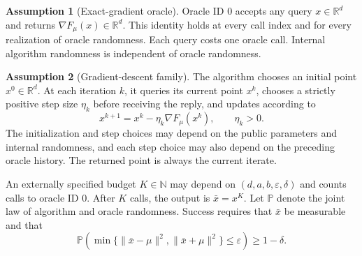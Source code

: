 \documentclass[10pt]{article}
\theoremstyle{definition}
\newtheorem{assumption}{Assumption}
\begin{document}
\begin{assumption}[Exact-gradient oracle]
Oracle ID $0$ accepts any query $x\in\mathbb{R}^d$ and returns $\nabla F_\mu(x)\in\mathbb{R}^d$. This identity holds at every call index and for every realization of oracle randomness. Each query costs one oracle call. Internal algorithm randomness is independent of oracle randomness.
\end{assumption}

\begin{assumption}[Gradient-descent family]
The algorithm chooses an initial point $x^0\in\mathbb{R}^d$. At each iteration $k$, it queries its current point $x^k$, chooses a strictly positive step size $\eta_k$ before receiving the reply, and updates according to
\[
x^{k+1}=x^k-\eta_k\nabla F_\mu(x^k),
\qquad \eta_k>0.
\]
The initialization and step choices may depend on the public parameters and internal randomness, and each step choice may also depend on the preceding oracle history. The returned point is always the current iterate.
\end{assumption}

An externally specified budget $K\in\mathbb{N}$ may depend on $(d,a,b,\varepsilon,\delta)$ and counts calls to oracle ID $0$. After $K$ calls, the output is $\bar{x}=x^K$. Let $\mathbb{P}$ denote the joint law of algorithm and oracle randomness. Success requires that $\bar{x}$ be measurable and that
\[
\mathbb{P}\!\left(
\min\{\|\bar{x}-\mu\|^2,\|\bar{x}+\mu\|^2\}
\leq\varepsilon
\right)\geq1-\delta.
\]
\end{document}
